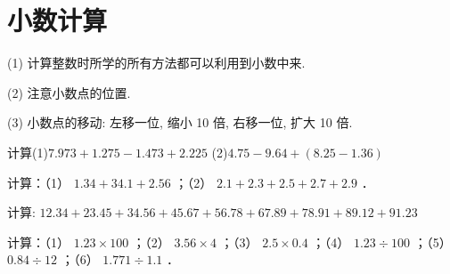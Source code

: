 \chapter{小数计算}



 (1) 计算整数时所学的所有方法都可以利用到小数中来.

 (2) 注意小数点的位置.

 (3) 小数点的移动: 左移一位, 缩小 10 倍, 右移一位, 扩大 10 倍.

 
  
 
\begin{example}
	\begin{problems}
		计算(1)$7.973+1.275-1.473+2.225$ \hfil   (2)$ 4.75-9.64+(8.25-1.36)$ 
	\end{problems} 
	
	\begin{Ssol}
		\vspace{\solfourproblems}
	\end{Ssol}
\end{example}

\begin{lianxi}
	\begin{problems}
		计算：（1） $1.34+34.1+2.56$ ；（2） $2.1+2.3+2.5+2.7+2.9$ ．
		
	\end{problems} 
	
	\begin{lxSsol}
		\vspace{\solthreeproblems}
	\end{lxSsol}
\end{lianxi}
\begin{example}
\begin{problems}
		计算: $12.34+23.45+34.56+45.67+56.78+67.89+78.91+89.12+91.23$
\end{problems} 

	
	\begin{Ssol}
		\vspace{\solfourproblems}
	\end{Ssol}
\end{example}





 
\begin{example}
	\begin{problems}
		计算：（1） $1.23 \times 100$ ；（2） $3.56 \times 4$ ；（3） $2.5 \times 0.4$ ；（4） $1.23 \div 100$ ；（5） $0.84 \div 12$ ；（6） $1.771 \div 1.1$ ．
		
	\end{problems} 
	
	\begin{Ssol}
		\vspace{\solthreeproblems}
	\end{Ssol}
\end{example}


